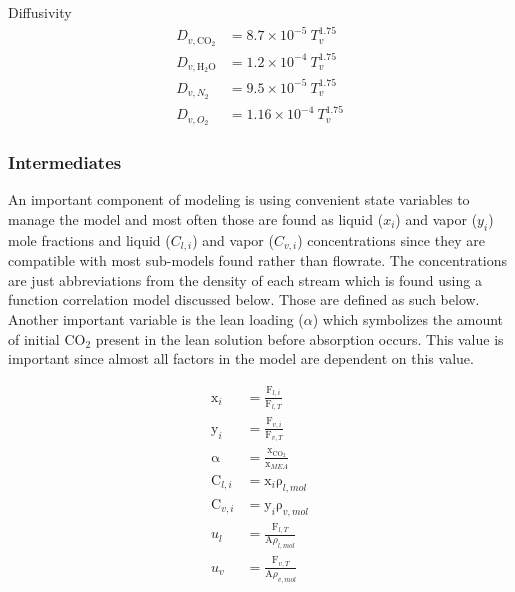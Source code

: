 \documentclass[12pt, letterpaper]{article}
\begin{document}
                Diffusivity
                \begin{align}
                    D _{v,\mathrm{CO}_2} &= 8.7 \times 10^{-5} \ T_v^{1.75} \\
                    D _{v,\mathrm{H_{2}O}} &= 1.2 \times 10^{-4} \ T_v^{1.75} \\
                    D _{v,N_2} &= 9.5 \times 10^{-5} \ T_v^{1.75} \\
                    D _{v,O_2} &= 1.16\times 10^{-4} \ T_v^{1.75}
                \end{align}
        
        \subsubsection{Intermediates}
        
            An important component of modeling is using convenient state variables to manage the model and most often those are found as liquid ($x_i$) and vapor ($y_i$) mole fractions and liquid ($C_{l,i}$) and vapor ($C_{v,i}$) concentrations since they are compatible with most sub-models found rather than flowrate.
            The concentrations are just abbreviations from the density of each stream which is found using a function correlation model discussed below.
            Those are defined as such below.
            Another important variable is the lean loading ($\alpha$) which symbolizes the amount of initial $\mathrm{CO}_2$ present in the lean solution before absorption occurs.
            This value is important since almost all factors in the model are dependent on this value.
        
            \begin{align}
                \mathrm{x}_i &= \frac{\mathrm{F}_{l, i}}{\mathrm{F}_{l, T}} \\
                \mathrm{y}_i &= \frac{\mathrm{F}_{v, i}}{\mathrm{F}_{v, T}} \\
                \mathrm{\alpha} &= \frac{\mathrm{x}_{\mathrm{CO}_2}}{\mathrm{x}_{MEA}} \\
                \mathrm{C}_{l, i} &= \mathrm{x}_i \mathrm{\rho}_{l, mol} \\
                \mathrm{C}_{v, i} &= \mathrm{y}_i \mathrm{\rho}_{v, mol} \\
                u_l &= \frac{\mathrm{F}_{l,T}}{\mathrm{A} \rho _{l,mol}} \\
                u_v &= \frac{\mathrm{F}_{v,T}}{\mathrm{A} \rho _{v,mol}}
            \end{align}
            
\end{document}
